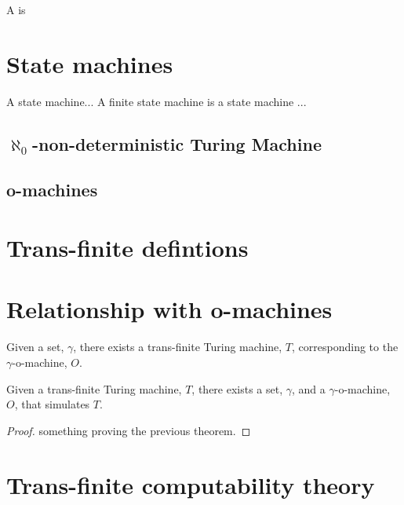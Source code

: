 \documentclass[a4paper,openany]{amsart}
\begin{document}
\begin{definition}
A  is 
\end{definition}

\section{State machines}

\begin{definition}

A state machine... A finite state machine is a state machine ...

\end{definition}

\subsection{$\aleph_0$-non-deterministic Turing Machine}

\subsection{o-machines}

\section{Trans-finite defintions}

\section{Relationship with o-machines}

\begin{theorem}

Given a set, $\gamma$, there exists a trans-finite Turing machine, $T$, corresponding to
the $\gamma$-o-machine, $O$.

\end{theorem}


\begin{theorem}

Given a trans-finite Turing machine, $T$, there exists a set, $\gamma$, and a
$\gamma$-o-machine, $O$, that simulates $T$.

\end{theorem}

\begin{proof}
something proving the previous theorem.
\end{proof}

\section{Trans-finite computability theory}




\end{document}
